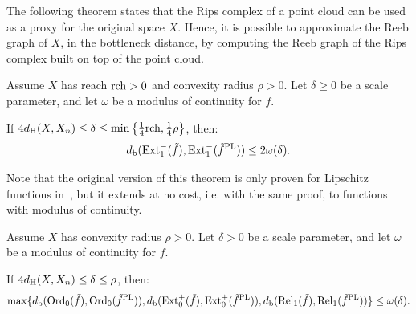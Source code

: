 The following theorem states that the Rips complex of a point cloud can be used as a proxy for the
 original space $X$. Hence, it is possible to approximate the Reeb graph of $X$,
in the bottleneck distance, by computing the Reeb graph of the Rips complex built on top of the point cloud.

\begin{thm}\label{th:Reebapprox1}
Assume $X$ has reach ${\rm rch}>0$ and convexity radius $\rho>0$.
Let $\delta\geq 0$ be a scale parameter,
and let $\omega$ be a modulus of continuity for $f$.

If $4d_{\rm H}(X,X_n)\leq\delta\leq\min\left\{\frac14 {\rm rch}, \frac14 \rho\right\}$, %
then:
$$d_{\rm b}(\mathrm{Ext}_1^-(\tilde{f}),\mathrm{Ext}_1^-({\tilde{f}}^{\rm PL}))\leq 2\omega(\delta).$$
\end{thm}

Note that the original version of this theorem is only proven for Lipschitz functions in~\cite{Dey13a}, but it extends at no cost,
i.e. with the same proof, to functions with modulus of continuity.

\begin{thm}\label{th:Reebapprox0}
Assume $X$ has
convexity radius $\rho >0$. 
Let $\delta>0$ be a scale parameter, 
and let $\omega$ be a modulus of continuity for $f$.

If $4d_{\rm H}(X,X_n)\leq\delta\leq \rho$, %
then:
$$\max\{d_{\rm b}(\mathrm{Ord}_0(\tilde{f}),\mathrm{Ord}_0({\tilde{f}}^{\rm PL})),
d_{\rm b}(\mathrm{Ext}_0^+(\tilde{f}),\mathrm{Ext}_0^+({\tilde{f}}^{\rm PL})),
d_{\rm b}(\mathrm{Rel}_1(\tilde{f}),\mathrm{Rel}_1({\tilde{f}}^{\rm PL}))\}\leq \omega(\delta).$$
\end{thm}

